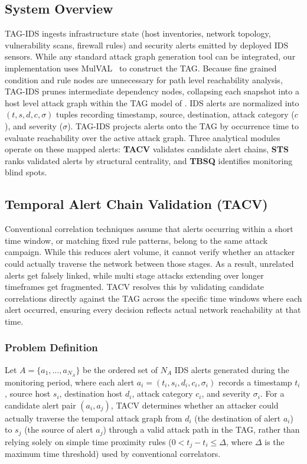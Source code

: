 \documentclass[runningheads]{llncs}
\begin{document}
\subsection{System Overview}

TAG-IDS ingests infrastructure state (host inventories, network topology, vulnerability scans, firewall rules) and security alerts emitted by deployed IDS sensors. While any standard attack graph generation tool can be integrated, our implementation uses MulVAL~\cite{mulval} to construct the TAG. Because fine grained condition and rule nodes are unnecessary for path level reachability analysis, TAG-IDS prunes intermediate dependency nodes, collapsing each snapshot into a host level attack graph within the TAG model of \cite{Gain2023}. IDS alerts are normalized into $(t, s, d, c, \sigma)$ tuples recording timestamp, source, destination, attack category ($c$), and severity ($\sigma$). TAG-IDS projects alerts onto the TAG by occurrence time to evaluate reachability over the active attack graph. Three analytical modules operate on these mapped alerts: \textbf{TACV} validates candidate alert chains, \textbf{STS} ranks validated alerts by structural centrality, and \textbf{TBSQ} identifies monitoring blind spots.

\subsection{Temporal Alert Chain Validation (TACV)}
\label{sec:tacv}

Conventional correlation techniques assume that alerts occurring within a short time window, or matching fixed rule patterns, belong to the same attack campaign. While this reduces alert volume, it cannot verify whether an attacker could actually traverse the network between those stages. As a result, unrelated alerts get falsely linked, while multi stage attacks extending over longer timeframes get fragmented. TACV resolves this by validating candidate correlations directly against the TAG across the specific time windows where each alert occurred, ensuring every decision reflects actual network reachability at that time.

\subsubsection{Problem Definition}
Let $A = \{a_1, \ldots, a_{N_A}\}$ be the ordered set of $N_A$ IDS alerts generated during the monitoring period, where each alert $a_i = (t_i, s_i, d_i, c_i, \sigma_i)$ records a timestamp $t_i$, source host $s_i$, destination host $d_i$, attack category $c_i$, and severity $\sigma_i$. For a candidate alert pair $(a_i, a_j)$, TACV determines whether an attacker could actually traverse the temporal attack graph from $d_i$ (the destination of alert $a_i$) to $s_j$ (the source of alert $a_j$) through a valid attack path in the TAG, rather than relying solely on simple time proximity rules ($0 < t_j - t_i \le \Delta$, where $\Delta$ is the maximum time threshold) used by conventional correlators.
\end{document}
